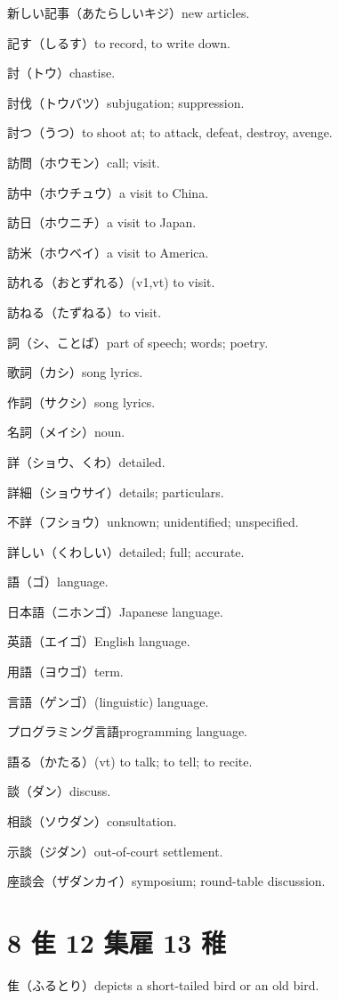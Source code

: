新しい記事（あたらしいキジ）new articles.

記す（しるす）to record, to write down.

討（トウ）chastise.

討伐（トウバツ）subjugation; suppression.

討つ（うつ）to shoot at; to attack, defeat, destroy, avenge.

訪問（ホウモン）call; visit.

訪中（ホウチュウ）a visit to China.

訪日（ホウニチ）a visit to Japan.

訪米（ホウベイ）a visit to America.

訪れる（おとずれる）(v1,vt) to visit.

訪ねる（たずねる）to visit.

詞（シ、ことば）part of speech; words; poetry.

歌詞（カシ）song lyrics.

作詞（サクシ）song lyrics.

名詞（メイシ）noun.

詳（ショウ、くわ）detailed.

詳細（ショウサイ）details; particulars.

不詳（フショウ）unknown; unidentified; unspecified.

詳しい（くわしい）detailed; full; accurate.

語（ゴ）language.

日本語（ニホンゴ）Japanese language.

英語（エイゴ）English language.

用語（ヨウゴ）term.

言語（ゲンゴ）(linguistic) language.

プログラミング言語programming language.

語る（かたる）(vt) to talk; to tell; to recite.

談（ダン）discuss.

相談（ソウダン）consultation.

示談（ジダン）out-of-court settlement.

座談会（ザダンカイ）symposium; round-table discussion.

\section{8 隹 12 集雇 13 稚}

隹（ふるとり）depicts a short-tailed bird or an old bird.

